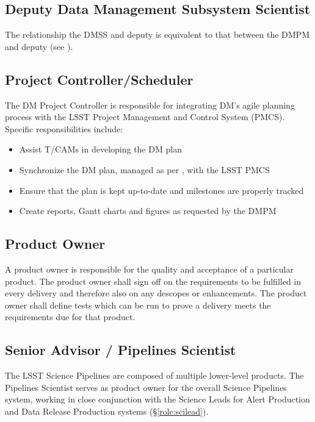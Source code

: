 \subsection{Deputy Data Management Subsystem Scientist}\label{role:ddmss}

The relationship the \gls{DMSS} and deputy is equivalent to that between the \gls{DMPM} and deputy (see ).


\subsection{Project Controller/Scheduler \label{role:pcon}}

The \gls{DM} Project Controller is responsible for integrating \gls{DM}'s agile planning process with the \gls{LSST} Project Management and Control System (\gls{PMCS}). Specific responsibilities include:

\begin{itemize}

  \item{Assist T/CAMs in developing the \gls{DM} plan}
  \item{Synchronize the \gls{DM} plan, managed as per , with the \gls{LSST} PMCS}
  \item{Ensure that the plan is kept up-to-date and milestones are properly tracked}
  \item{Create reports, Gantt charts and figures as requested by the \gls{DMPM}}

\end{itemize}

\subsection{Product Owner \label{role:prodo}}

A product owner is responsible for the quality and acceptance of a particular product.
The product owner shall sign off on the requirements to be fulfilled in every delivery and therefore also on any descopes or enhancements.
The product owner shall define tests which can be run to prove a delivery meets the requirements due for that product.

\subsection{Senior Advisor / Pipelines Scientist \label{role:pipe}}

The \gls{LSST} \gls{Science Pipelines} are composed of multiple lower-level products.
The Pipelines Scientist serves as product owner for the overall \gls{Science Pipelines} system, working in close conjunction with the Science Leads for Alert Production and Data Release Production systems (\S\ref{role:scilead}).

